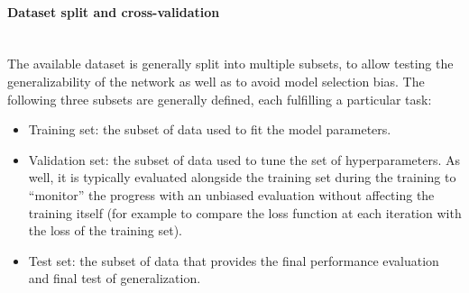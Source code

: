 \paragraph{Dataset split and cross-validation}\mbox{}\\
The available dataset is generally split into multiple subsets, to allow testing the generalizability of the network as well as to avoid model selection bias.
The following three subsets are generally defined, each fulfilling a particular task:
\begin{itemize}
    \item Training set: the subset of data used to fit the model parameters.
    \item Validation set: the subset of data used to tune the set of hyperparameters. As well, it is typically evaluated alongside the training set during the training to ``monitor'' the progress with an unbiased evaluation without affecting the training itself (for example to compare the loss function at each iteration with the loss of the training set). 
    \item Test set: the subset of data that provides the final performance evaluation and final test of generalization. 
\end{itemize}

